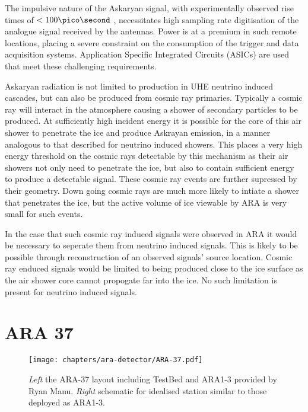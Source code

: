 The impulsive nature of the Askaryan signal, with experimentally observed rise times of $< 100 \pico \second$ \cite{PhysRevLett.86.2802}, necessitates high sampling rate digitisation of the analogue signal received by the antennas. Power is at a premium in such remote locations, placing a severe constraint on the consumption of the trigger and data acquisition systems. Application Specific Integrated Circuits (ASICs) are used that meet these challenging requirements.

Askaryan radiation is not limited to production in UHE neutrino induced cascades, but can also be produced from cosmic ray primaries. Typically a cosmic ray will interact in the atmosphere causing a shower of secondary particles to be produced. At sufficiently high incident energy it is possible for the core of this air shower to penetrate the ice and produce Askrayan emission, in a manner analogous to that described for neutrino induced showers. This places a very high energy threshold on the cosmic rays detectable by this mechanism as their air showers not only need to penetrate the ice, but also to contain sufficient energy to produce a detectable signal. These cosmic ray events are further supressed by their geometry. Down going cosmic rays are much more likely to intiate a shower that penetrates the ice, but the active volume of ice viewable by ARA is very small for such events. 

In the case that such cosmic ray induced signals were observed in ARA it would be necessary to seperate them from neutrino induced signals. This is likely to be possible through reconstruction of an observed signals' source location. Cosmic ray enduced signals would be limited to being produced close to the ice surface as the air shower core cannot propogate far into the ice. No such limitation is present for neutrino induced signals.


\section{ARA 37}
\label{sec:ara-detector:ARA37}

\begin{figure}[htpb]
  \centering
  \texttt{[image: chapters/ara-detector/ARA-37.pdf]}
  \caption{\textit{Left} the ARA-37 layout including TestBed and ARA1-3 provided by Ryan Manu. \textit{Right} schematic for idealised station similar to those deployed as ARA1-3.}
  \label{fig:ara-detector:ARA-37:ARA-37}
\end{figure}

